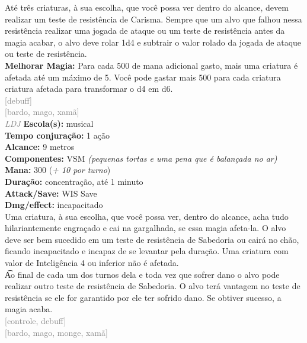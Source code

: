 \documentclass{RPG_Adventure}[2021/10/20]
\begin{document}
{\normalsize Até três criaturas, à sua escolha, que você possa ver dentro do alcance, devem realizar um teste de resistência de Carisma. Sempre que um alvo que falhou nessa resistência realizar uma jogada de ataque ou um teste de resistência antes da magia acabar, o alvo deve rolar 1d4 e subtrair o valor rolado da jogada de ataque ou teste de resistência.\\\t \textbf{Melhorar Magia:} Para cada 500 de mana adicional gasto, mais uma criatura é afetada até um máximo de 5. Você pode gastar mais 500 para cada criatura criatura afetada para transformar o d4 em d6.\\}
{\scriptsize \textcolor{gray}{[debuff]\\}}
{\scriptsize \textcolor{gray}{[bardo, mago, xamã]\\}}
{\tiny \textcolor{gray}{\textit{LDJ}}}\jump{}
{\small \t \textbf{Escola(s):} musical\\\t \textbf{Tempo conjuração:} 1 ação\\\t \textbf{Alcance:} 9 metros\\\t \textbf{Componentes:} VSM \textit{(pequenas tortas e uma pena que é balançada no ar)}\\\t \textbf{Mana:} 300 (\textit{+ 10 por turno})\\\t \textbf{Duração:} concentração, até 1 minuto\\\t \textbf{Attack/Save:} WIS Save\\\t \textbf{Dmg/effect:} incapacitado\\}
{\normalsize Uma criatura, à sua escolha, que você possa ver, dentro do alcance, acha tudo hilariantemente engraçado e cai na gargalhada, se essa magia afeta-la. O alvo deve ser bem sucedido em um teste de resistência de Sabedoria ou cairá no chão, ficando incapacitado e incapaz de se levantar pela duração. Uma criatura com valor de Inteligência 4 ou inferior não é afetada.\\\t Ao final de cada um dos turnos dela e toda vez que sofrer dano o alvo pode realizar outro teste de resistência de Sabedoria. O alvo terá vantagem no teste de resistência se ele for garantido por ele ter sofrido dano. Se obtiver sucesso, a magia acaba.\\}
{\scriptsize \textcolor{gray}{[controle, debuff]\\}}
{\scriptsize \textcolor{gray}{[bardo, mago, monge, xamã]\\}}
\end{document}
